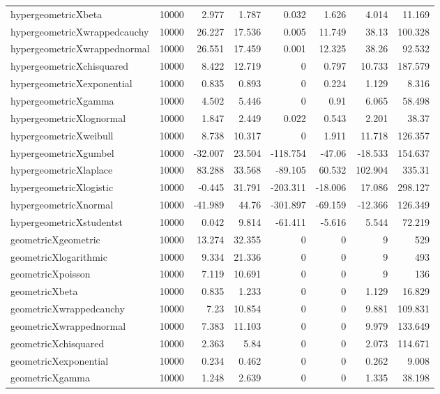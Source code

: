 \begin{table}[!htbp]
{\begin{tabular}{lrrrrrrr}
hypergeometricXbeta & 10000 & 2.977 & 1.787 & 0.032 & 1.626 & 4.014 & 11.169 \\ 
hypergeometricXwrappedcauchy & 10000 & 26.227 & 17.536 & 0.005 & 11.749 & 38.13 & 100.328 \\ 
hypergeometricXwrappednormal & 10000 & 26.551 & 17.459 & 0.001 & 12.325 & 38.26 & 92.532 \\ 
hypergeometricXchisquared & 10000 & 8.422 & 12.719 & 0 & 0.797 & 10.733 & 187.579 \\ 
hypergeometricXexponential & 10000 & 0.835 & 0.893 & 0 & 0.224 & 1.129 & 8.316 \\ 
hypergeometricXgamma & 10000 & 4.502 & 5.446 & 0 & 0.91 & 6.065 & 58.498 \\ 
hypergeometricXlognormal & 10000 & 1.847 & 2.449 & 0.022 & 0.543 & 2.201 & 38.37 \\ 
hypergeometricXweibull & 10000 & 8.738 & 10.317 & 0 & 1.911 & 11.718 & 126.357 \\ 
hypergeometricXgumbel & 10000 & -32.007 & 23.504 & -118.754 & -47.06 & -18.533 & 154.637 \\ 
hypergeometricXlaplace & 10000 & 83.288 & 33.568 & -89.105 & 60.532 & 102.904 & 335.31 \\ 
hypergeometricXlogistic & 10000 & -0.445 & 31.791 & -203.311 & -18.006 & 17.086 & 298.127 \\ 
hypergeometricXnormal & 10000 & -41.989 & 44.76 & -301.897 & -69.159 & -12.366 & 126.349 \\ 
hypergeometricXstudentst & 10000 & 0.042 & 9.814 & -61.411 & -5.616 & 5.544 & 72.219 \\ 
geometricXgeometric & 10000 & 13.274 & 32.355 & 0 & 0 & 9 & 529 \\ 
geometricXlogarithmic & 10000 & 9.334 & 21.336 & 0 & 0 & 9 & 493 \\ 
geometricXpoisson & 10000 & 7.119 & 10.691 & 0 & 0 & 9 & 136 \\ 
geometricXbeta & 10000 & 0.835 & 1.233 & 0 & 0 & 1.129 & 16.829 \\ 
geometricXwrappedcauchy & 10000 & 7.23 & 10.854 & 0 & 0 & 9.881 & 109.831 \\ 
geometricXwrappednormal & 10000 & 7.383 & 11.103 & 0 & 0 & 9.979 & 133.649 \\ 
geometricXchisquared & 10000 & 2.363 & 5.84 & 0 & 0 & 2.073 & 114.671 \\ 
geometricXexponential & 10000 & 0.234 & 0.462 & 0 & 0 & 0.262 & 9.008 \\ 
geometricXgamma & 10000 & 1.248 & 2.639 & 0 & 0 & 1.335 & 38.198 \\ 

\end{tabular}}
\end{table}
